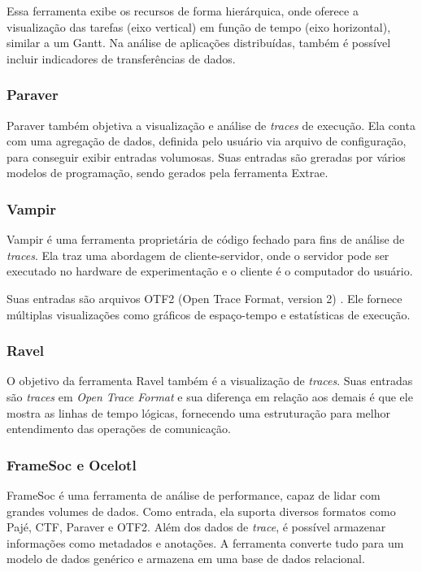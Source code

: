 \documentclass[prop-esp]{iiufrgs}
\begin{document}
Essa ferramenta exibe os recursos de forma hierárquica, onde oferece a visualização das tarefas (eixo vertical) em função de tempo (eixo horizontal), similar a um Gantt. Na análise de aplicações distribuídas, também é possível incluir indicadores de transferências de dados.

\subsubsection*{Paraver}
Paraver \cite{ref:paraver} também objetiva a visualização e análise de \emph{traces} de execução. Ela conta com uma agregação de dados, definida pelo
usuário via arquivo de configuração, para conseguir exibir entradas volumosas. Suas entradas são greradas por vários modelos de programação, sendo gerados pela ferramenta Extrae.

\subsubsection*{Vampir}
Vampir \cite{ref:vampir} é uma ferramenta proprietária de código fechado para fins de análise de \emph{traces}. Ela traz uma abordagem de cliente-servidor, onde o servidor pode ser executado no hardware de experimentação e o cliente é o computador do usuário.

Suas entradas são arquivos OTF2 (Open Trace Format, version 2) \cite{ref:otf2}. Ele fornece múltiplas visualizações como gráficos de espaço-tempo e estatísticas de execução.

\subsubsection*{Ravel}
O objetivo da ferramenta Ravel \cite{ref:ravel} também é a visualização de \emph{traces}. Suas entradas são \emph{traces} em \emph{Open Trace Format} e sua diferença em relação aos demais é que ele mostra as linhas de tempo lógicas, fornecendo uma estruturação para melhor entendimento das operações de comunicação.

\subsubsection*{FrameSoc e Ocelotl}

FrameSoc \cite{ref:framesoc} é uma ferramenta de análise de performance, capaz de lidar com grandes volumes de dados. Como entrada, ela suporta diversos
formatos como Pajé, CTF, Paraver e OTF2. Além dos dados de \emph{trace}, é possível armazenar informações como metadados e anotações. A ferramenta converte tudo para um modelo de dados genérico e armazena em uma base de dados relacional.
\end{document}
